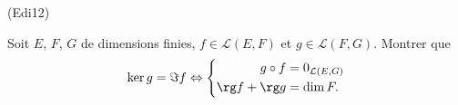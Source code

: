 \begin{tiny}(Edi12)\end{tiny} Soit $E$, $F$, $G$ de dimensions finies, $f\in \mathcal{L}(E,F)$ et $g\in \mathcal{L}(F,G)$. Montrer que
\[
 \ker g = \Im f \Leftrightarrow 
 \left\lbrace 
 \begin{aligned}
  g\circ f &= 0_{\mathcal{L}(E,G)} \\
  \rg f + \rg g &= \dim F.
 \end{aligned}
\right. 
\]
